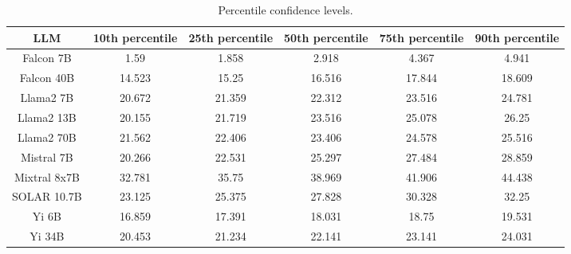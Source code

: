 \begin{table*}
\centering
\begin{tabular}{c|c|c|c|c|c}
LLM & 10th percentile & 25th percentile & 50th percentile & 75th percentile & 90th percentile\\ \hline
Falcon 7B & 1.59 & 1.858 & 2.918 & 4.367 & 4.941\\
Falcon 40B & 14.523 & 15.25 & 16.516 & 17.844 & 18.609\\
Llama2 7B & 20.672 & 21.359 & 22.312 & 23.516 & 24.781\\
Llama2 13B & 20.155 & 21.719 & 23.516 & 25.078 & 26.25\\
Llama2 70B & 21.562 & 22.406 & 23.406 & 24.578 & 25.516\\
Mistral 7B & 20.266 & 22.531 & 25.297 & 27.484 & 28.859\\
Mixtral 8x7B & 32.781 & 35.75 & 38.969 & 41.906 & 44.438\\
SOLAR 10.7B & 23.125 & 25.375 & 27.828 & 30.328 & 32.25\\
Yi 6B & 16.859 & 17.391 & 18.031 & 18.75 & 19.531\\
Yi 34B & 20.453 & 21.234 & 22.141 & 23.141 & 24.031\\
\hline
\end{tabular}
\caption{Percentile confidence levels.}
\label{tab:percentile_conf}
\end{table*}
